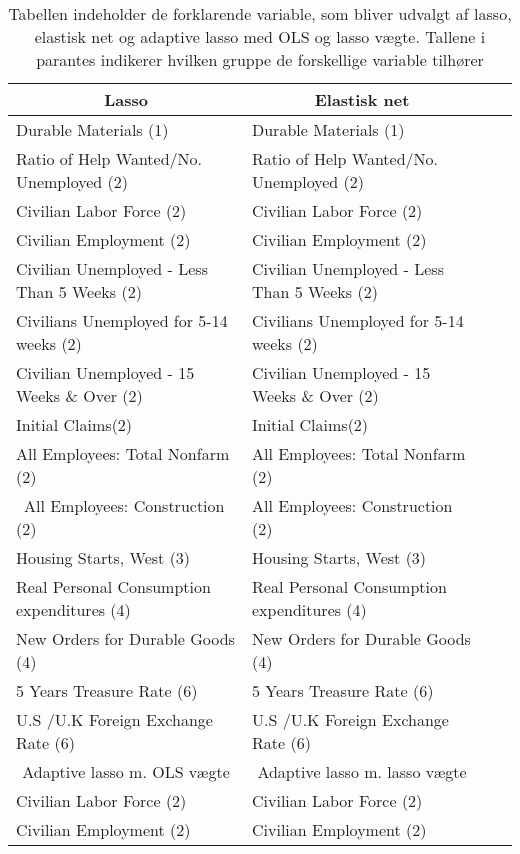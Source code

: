  \begin{table}
\small
\center
\begin{tabular}{lllc}
\toprule
\multicolumn{1}{c}{Lasso} & \multicolumn{1}{c}{Elastisk net} \\ \midrule
Durable Materials (1)   &Durable Materials (1)    \\
Ratio of Help Wanted/No. Unemployed (2) &  Ratio of Help Wanted/No. Unemployed (2) \\
Civilian Labor Force (2) & Civilian Labor Force (2)  \\
Civilian Employment  (2) & Civilian Employment  (2)  \\
Civilian Unemployed - Less Than 5 Weeks (2) & Civilian Unemployed - Less Than 5 Weeks (2)  \\
Civilians Unemployed for 5-14 weeks (2) &Civilians Unemployed for 5-14 weeks (2)    \\
Civilian Unemployed - 15 Weeks \& Over (2) & Civilian Unemployed - 15 Weeks \& Over (2)  \\
Initial Claims(2) &  Initial Claims(2)  \\ 
All Employees: Total Nonfarm (2) & All Employees: Total Nonfarm (2)   \\\
All Employees: Construction (2) & All Employees: Construction (2)  \\
Housing Starts, West (3) & Housing Starts, West (3)  \\
Real Personal Consumption expenditures (4) & Real Personal Consumption expenditures (4) \\
New Orders for Durable Goods (4) & New Orders for Durable Goods (4)   \\
5 Years Treasure Rate (6) & 5 Years Treasure Rate (6)  \\
U.S /U.K Foreign Exchange Rate  (6) & U.S /U.K Foreign Exchange Rate  (6) \\  \bottomrule 
\toprule
\multicolumn{1}{c}{Adaptive lasso m. OLS vægte} & \multicolumn{1}{c}{ Adaptive lasso m. lasso vægte}  \\ \midrule
Civilian Labor Force  (2) & Civilian Labor Force (2) \\
Civilian Employment (2) &  Civilian Employment (2) \\
 \bottomrule 
\end{tabular}
\caption{Tabellen indeholder de forklarende variable, som bliver udvalgt af lasso, elastisk net og adaptive lasso med OLS og lasso vægte. Tallene i parantes indikerer hvilken gruppe de forskellige variable tilhører} \label{tab: lasso_ud}
\end{table}
